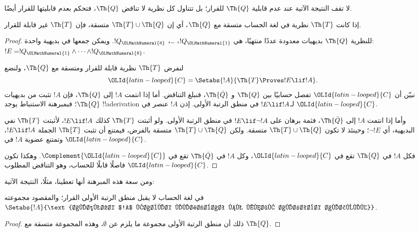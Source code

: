\documentclass[../../../include/open-logic-section]{subfiles}
\begin{document}


لا تقف النتيجة الآتية عند عدم قابلية $\Th{Q}$ للقرار؛ بل تتناول
كل نظرية لا تناقض $\Th{Q}$، فتحكم بعدم قابليتها للقرار أيضًا.

\begin{thm}
إذا كانت $\Th{T}$ نظرية في لغة الحساب متسقة مع $\Th{Q}$، أي إن
$\Th{T}\cup\Th{Q}$ متسقة، فإن $\Th{T}$ غير قابلة للقرار.
\end{thm}

\begin{proof}
للنظرية $\Th{Q}$ بديهيات معدودة عددًا منتهيًا، هي $!Q_{\OLMathNumeral{1}}$، \dots،
$!Q_{\OLMathNumeral{8}}$. ويمكن جمعها في بديهية واحدة:
$!E=!Q_{\OLMathNumeral{1}}\land\dots\land !Q_{\OLMathNumeral{8}}$.

لنفرض $\Th{T}$ نظرية قابلة للقرار ومتسقة مع $\Th{Q}$، ولنضع
\[
{\OLId{latin-looped}{C}}=\Setabs{!A}{\Th{T}\Proves !E\lif !A}.
\]
نبيّن أن ${\OLId{latin-looped}{C}}$ تفصل حسابيًا بين $\Th{Q}$ و
$\Th{\bar Q}$، فنبلغ التناقض. أما إذا انتمت $!A$ إلى $\Th{Q}$،
فإن $!A$ تثبت من بديهيات $\Th{Q}$؛ فبمبرهنة الاستنباط يوجد
!!a{derivation} لـ$!E\lif !A$ في منطق الرتبة الأولى.
إذن $!A$ عنصر في ${\OLId{latin-looped}{C}}$.

وأما إذا انتمت $!A$ إلى $\Th{\bar Q}$، فثمة برهان على
$!E\lif\lnot !A$ في منطق الرتبة الأولى. ولو أثبتت $\Th{T}$
كذلك $!E\lif !A$، لأثبتت $\Th{T}$ نفي البديهية، أي $\lnot !E$؛
وحينئذ لا تكون $\Th{T}\cup\Th{Q}$ متسقة. ولكن
$\Th{T}\cup\Th{Q}$ متسقة بالفرض، فيمتنع أن تثبت $\Th{T}$
الجملة $!E\lif !A$، وتمتنع عضوية $!A$ في ${\OLId{latin-looped}{C}}$.

فكل $!A$ في $\Th{Q}$ تقع في ${\OLId{latin-looped}{C}}$،
وكل $!A$ في $\Th{\bar Q}$ تقع في $\Complement{{\OLId{latin-looped}{C}}}$.
وهكذا تكون ${\OLId{latin-looped}{C}}$ فاصلًا قابلًا للحساب، وهو التناقض المطلوب.
\end{proof}

ومن سعة هذه المبرهنة أنها تعطينا، مثلًا، النتيجة الآتية:

\begin{cor}
  في لغة الحساب لا يقبل منطق الرتبة الأولى القرار؛ والمقصود مجموعته
  $\Setabs{!A}{\text{الصيغة $!A$ قابلة للإثبات في منطق الرتبة الأولى}}$.
\end{cor}

\begin{proof}
ذلك أن منطق الرتبة الأولى مجموعة ما يلزم عن $\emptyset$،
وهذه المجموعة متسقة مع $\Th{Q}$.
\end{proof}
\end{document}
